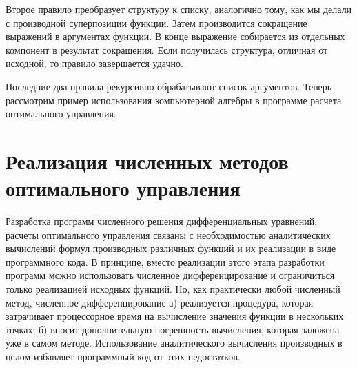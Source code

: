 \documentclass[a4paper,14pt, openany, twoside, final]{extbook} %
\begin{document}
Второе правило преобразует структуру к списку, аналогично тому, как мы делали с производной суперпозиции функции.  Затем производится сокращение выражений в аргументах функции.  В конце выражение собирается из отдельных компонент в результат сокращения.  Если получилась структура, отличная от исходной, то правило завершается удачно.

Последние два правила рекурсивно обрабатывают список аргументов.  Теперь рассмотрим пример использования компьютерной алгебры в программе расчета оптимального управления.

\section{Реализация численных методов оптимального управления}
\label{sec:optcontr}
\lstset{language=Python}

\newcommand{\vecx}{\mathbfit{x}}
\newcommand{\vecf}{\mathbfit{f}}
\newcommand{\vecg}{\mathbfit{g}}
\newcommand{\vecu}{\mathbfit{u}}
\newcommand{\vecpsi}{\mathbfit{\psi}}
\newcommand{\vecH}{\mathbfit{H}}

Разработка программ численного решения дифференциальных уравнений, расчеты оптимального управления связаны с необходимостью аналитических вычислений формул производных различных функций и их реализации в виде программного кода.  В принципе, вместо реализации этого этапа разработки программ можно использовать численное дифференцирование и ограничиться только реализацией исходных функций.  Но, как практически любой численный метод, численное дифференцирование а) реализуется процедура, которая затрачивает процессорное время на вычисление значения функции в нескольких точках; б) вносит дополнительную погрешность вычисления, которая заложена уже в самом методе.  Использование аналитического вычисления производных в целом избавляет программный код от этих недостатков.
\end{document}
